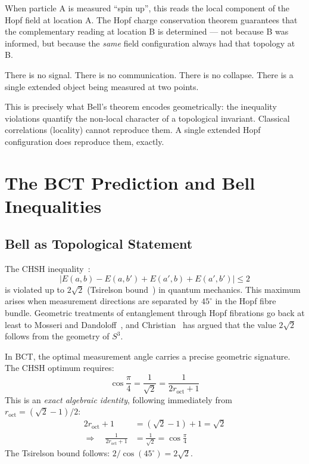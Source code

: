 \documentclass[aps,prl,twocolumn,showpacs,preprintnumbers]{revtex4-2}
\newcommand{\roct}{r_{\mathrm{oct}}}
\begin{document}
When particle A is measured ``spin up'', this reads the local
component of the Hopf field at location A. The Hopf charge
conservation theorem guarantees that the complementary
reading at location B is determined --- not because B was
informed, but because the \emph{same} field configuration
always had that topology at B.

There is no signal. There is no communication. There is no
collapse. There is a single extended object being measured
at two points.

This is precisely what Bell's theorem encodes geometrically:
the inequality violations quantify the non-local character
of a topological invariant. Classical correlations (locality)
cannot reproduce them. A single extended Hopf configuration
does reproduce them, exactly.

\section{The BCT Prediction and Bell Inequalities}

\subsection{Bell as Topological Statement}

The CHSH inequality~\cite{chsh}:
\begin{equation}
|E(a,b) - E(a,b') + E(a',b) + E(a',b')| \leq 2
\end{equation}
is violated up to $2\sqrt{2}$ (Tsirelson bound~\cite{tsirelson})
in quantum mechanics. This maximum arises when measurement
directions are separated by $45^\circ$ in the Hopf fibre bundle.
Geometric treatments of entanglement through Hopf fibrations
go back at least to Mosseri and Dandoloff~\cite{mosseri},
and Christian~\cite{christian} has argued that the value
$2\sqrt{2}$ follows from the geometry of $S^3$.

In BCT, the optimal measurement angle carries a precise
geometric signature. The CHSH optimum requires:
\begin{equation}
\cos\frac{\pi}{4} = \frac{1}{\sqrt{2}} = \frac{1}{2\roct + 1}
\label{eq:tsirelson}
\end{equation}
This is an \emph{exact algebraic identity}, following
immediately from $\roct = (\sqrt{2}-1)/2$:
\begin{align}
2\roct + 1 &= (\sqrt{2}-1) + 1 = \sqrt{2} \nonumber \\
\Rightarrow\quad \frac{1}{2\roct+1} &= \frac{1}{\sqrt{2}} = \cos\frac{\pi}{4}
\end{align}
The Tsirelson bound follows:
$2/\cos(45^\circ) = 2\sqrt{2}$.
\end{document}
